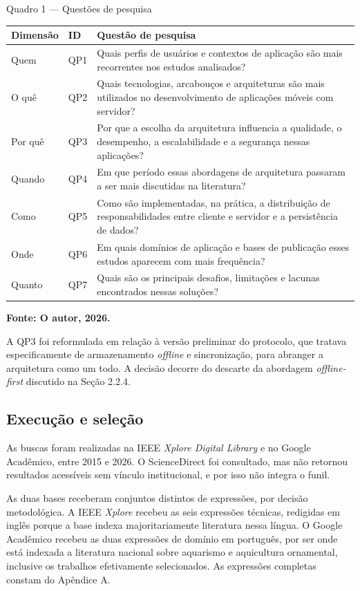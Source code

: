 \documentclass[12pt,oneside,a4paper,brazilian]{abntex2}
\newcommand{\legendaabnt}[1]{%
  \par\vspace{9pt}%
  \begingroup\centering\normalsize\SingleSpacing #1\par\endgroup
  \vspace{3pt}}
\newcommand{\fonteabnt}[1]{%
  \par\vspace{3pt}%
  \begingroup\centering\normalsize\SingleSpacing\bfseries #1\par\endgroup
  \vspace{9pt}}
\begin{document}
\legendaabnt{Quadro 1 --- Questões de pesquisa}
{\footnotesize\SingleSpacing
\setlength{\LTpre}{0pt}\setlength{\LTpost}{0pt}
\setlength{\extrarowheight}{3pt}
\begin{longtable}{|>{\raggedright\arraybackslash}p{1.6cm}|>{\raggedright\arraybackslash}p{1.0cm}|>{\raggedright\arraybackslash}p{11.5cm}|}
\hline
\textbf{Dimensão} & \textbf{ID} & \textbf{Questão de pesquisa} \\[2pt] \hline \endhead
Quem & QP1 & Quais perfis de usuários e contextos de aplicação são mais recorrentes nos estudos analisados? \\[2pt] \hline
O quê & QP2 & Quais tecnologias, arcabouços e arquiteturas são mais utilizados no desenvolvimento de aplicações móveis com servidor? \\[2pt] \hline
Por quê & QP3 & Por que a escolha da arquitetura influencia a qualidade, o desempenho, a escalabilidade e a segurança nessas aplicações? \\[2pt] \hline
Quando & QP4 & Em que período essas abordagens de arquitetura passaram a ser mais discutidas na literatura? \\[2pt] \hline
Como & QP5 & Como são implementadas, na prática, a distribuição de responsabilidades entre cliente e servidor e a persistência de dados? \\[2pt] \hline
Onde & QP6 & Em quais domínios de aplicação e bases de publicação esses estudos aparecem com mais frequência? \\[2pt] \hline
Quanto & QP7 & Quais são os principais desafios, limitações e lacunas encontrados nessas soluções? \\[2pt] \hline
\end{longtable}}
\fonteabnt{Fonte: O autor, 2026.}
A QP3 foi reformulada em relação à versão preliminar do protocolo, que tratava especificamente de armazenamento \textit{offline} e sincronização, para abranger a arquitetura como um todo. A decisão decorre do descarte da abordagem \textit{offline-first} discutido na Seção 2.2.4.


\subsection{Execução e seleção}
As buscas foram realizadas na IEEE \textit{Xplore Digital Library} e no Google Acadêmico, entre 2015 e 2026. O ScienceDirect foi consultado, mas não retornou resultados acessíveis sem vínculo institucional, e por isso não integra o funil.

As duas bases receberam conjuntos distintos de expressões, por decisão metodológica. A IEEE \textit{Xplore} recebeu as seis expressões técnicas, redigidas em inglês porque a base indexa majoritariamente literatura nessa língua. O Google Acadêmico recebeu as duas expressões de domínio em português, por ser onde está indexada a literatura nacional sobre aquarismo e aquicultura ornamental, inclusive os trabalhos efetivamente selecionados. As expressões completas constam do Apêndice A.
\end{document}
